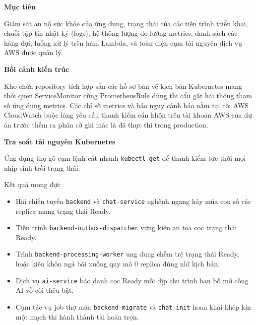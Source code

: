 \vspace{0.5em}\noindent\textbf{Mục tiêu}\par

Giám sát an nộ sức khỏe của ứng dụng, trạng thái của các tiến trình
triển khai, chuỗi tập tin nhật ký (logs), hệ thông lượng đo lường
metrics, danh sách các hàng đợi, luồng xử lý trên hàm Lambda, và toàn
diện cụm tài nguyên dịch vụ AWS được quản lý.

\vspace{0.5em}\noindent\textbf{Bối cảnh kiến
trúc}\par

Kho chứa repository tích hợp sẵn các hồ sơ bản vẽ kịch bản Kubernetes
mang thói quen ServiceMonitor cùng PrometheusRule dùng thi cẩu gặt hái
thông tham số ứng dụng metrics. Các chỉ số metrics và báo nguy cảnh báo
nằm tại cõi AWS CloudWatch buộc lòng yêu cầu thanh kiểm cẩn khôn trên
tài khoản AWS của dự án trước thềm ra phán cờ ghi mác là đã thực thi
trong production.

\vspace{0.5em}\noindent\textbf{Tra soát tài nguyên
Kubernetes}\par

Ứng dụng thọ gõ cụm lệnh cất nhanh \texttt{kubectl\ get} để thanh kiểm
tức thời mọi nhịp sinh trồi trạng thái:

\begin{Shaded}
\begin{Highlighting}[]
\OperatorTok{=}
\end{Highlighting}
\end{Shaded}

Kết quả mong đợi:

\begin{itemize}
\tightlist
\item
  Hai chiến tuyến \texttt{backend} và \texttt{chat-\allowbreak{}service} nghênh ngang
  hãy múa con số các replica mang trạng thái Ready.
\item
  Tiến trình \texttt{backend-\allowbreak{}outbox-\allowbreak{}dispatcher} vững kiên an tọa cọc
  trạng thái Ready.
\item
  Trình \texttt{backend-\allowbreak{}processing-\allowbreak{}worker} ung dung chễm trệ trạng thái
  Ready, hoặc kiên khôn ngả bãi xuống quy mô 0 replica đúng nhĩ kịch
  bản.
\item
  Dịch vụ \texttt{ai-\allowbreak{}service} báo danh cọc Ready mỗi dịp chu trình ban
  bố mở cống AI vỗ còi thêu bật.
\item
  Cụm tác vụ job thợ múa \texttt{backend-\allowbreak{}migrate} và \texttt{chat-\allowbreak{}init}
  hoan khải khép kín một mạch thi hành thành tài hoàn trọn.
\end{itemize}

